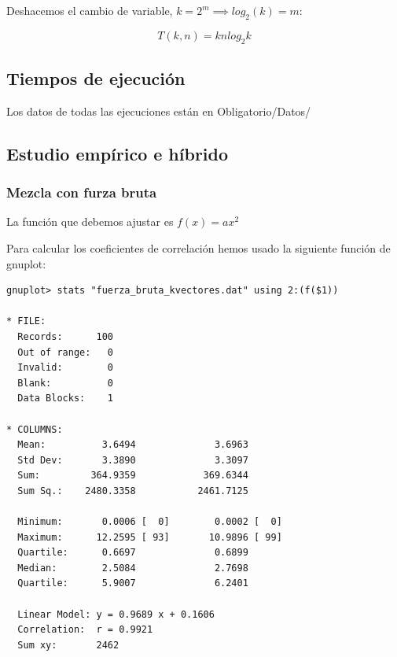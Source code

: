 \begin{center}
	Deshacemos el cambio de variable, $k=2^m \implies log_2(k)=m$:
\end{center}
\[T(k,n) = knlog_2k\]


\subsection{Tiempos de ejecuci\'on}
Los datos de todas las ejecuciones est\'an en Obligatorio/Datos/

\newpage

\subsection{Estudio emp\'irico e h\'ibrido}
\subsubsection{Mezcla con furza bruta}
La funci\'on que debemos ajustar es $f(x) = ax^2$

\begin{center}
\end{center}

Para calcular los coeficientes de correlaci\'on hemos usado la siguiente funci\'on de gnuplot:

\begin{lstlisting}[language=gnuplot]
gnuplot> stats "fuerza_bruta_kvectores.dat" using 2:(f($1))

* FILE: 
  Records:      100
  Out of range:   0
  Invalid:        0
  Blank:          0
  Data Blocks:    1

* COLUMNS:
  Mean:          3.6494              3.6963
  Std Dev:       3.3890              3.3097
  Sum:         364.9359            369.6344
  Sum Sq.:    2480.3358           2461.7125

  Minimum:       0.0006 [  0]        0.0002 [  0]
  Maximum:      12.2595 [ 93]       10.9896 [ 99]
  Quartile:      0.6697              0.6899
  Median:        2.5084              2.7698
  Quartile:      5.9007              6.2401

  Linear Model: y = 0.9689 x + 0.1606
  Correlation:  r = 0.9921
  Sum xy:       2462

\end{lstlisting}

